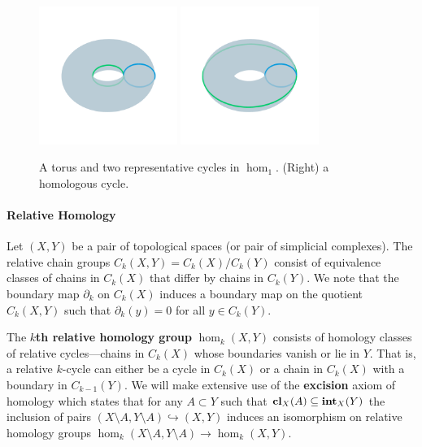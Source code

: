 \begin{figure}[htbp]
  \centering
  \includegraphics[trim=0 300 0 300, clip, width=0.4\textwidth]{figures/torus1.pdf}
  \includegraphics[trim=0 300 0 300, clip, width=0.4\textwidth]{figures/torus2.pdf}
  \caption{A torus and two representative cycles in $\hom_1$. (Right) a homologous cycle.}\label{fig:torus}
\end{figure}

\paragraph{Relative Homology}

Let $(X, Y)$ be a pair of topological spaces (or pair of simplicial complexes).
The relative chain groups $C_k(X, Y) = C_k(X) / C_k(Y)$ consist of equivalence classes of chains in $C_k(X)$ that differ by chains in $C_k(Y)$.
We note that the boundary map $\partial_k$ on $C_k(X)$ induces a boundary map on the quotient $C_k(X, Y)$ such that $\partial_k(y) = 0$ for all $y\in C_k(Y)$.

The \textbf{$k$th relative homology group} $\hom_k(X, Y)$ consists of homology classes of relative cycles---chains in $C_k(X)$ whose boundaries vanish or lie in $Y$.
That is, a relative $k$-cycle can either be a cycle in $C_k(X)$ or a chain in $C_k(X)$ with a boundary in $C_{k-1}(Y)$.
We will make extensive use of the \textbf{excision} axiom of homology which states that for any $A\subset Y$ such that $\mathbf{cl}_X(A)\subseteq \mathbf{int}_X(Y)$ the inclusion of pairs $(X\setminus A, Y\setminus A)\hookrightarrow (X, Y)$ induces an isomorphism on relative homology groups $\hom_k(X\setminus A, Y\setminus A)\to\hom_k(X, Y)$.

